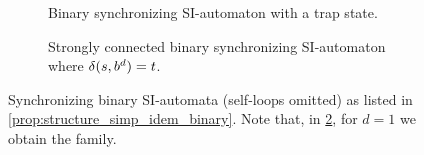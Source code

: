 \begin{figure}[htb]
\begin{subfigure}[t]{.48\textwidth}
{%
		}
		\caption{Binary synchronizing SI-automaton with a trap state.}
		\label{prelim:fig:binarySI-sync-trap}
	\end{subfigure}\hfill
	\begin{subfigure}[t]{.48\textwidth}
		\centering
		\caption{Strongly connected binary synchronizing SI-automaton where
			$\delta(s,b^d)=t$.}
		\label{prelim:fig:binarySI-sync-SCC}
	\end{subfigure}
	
	\caption[Synchronizing binary SI-automata]{Synchronizing binary SI-automata (self-loops omitted)
		as listed in \cref{prop:structure_simp_idem_binary}.
		Note that, in \cref{prelim:fig:binarySI-sync-SCC}, for $d=1$ we obtain the \Cerny family.}
	\label{prelim:fig:three-state-sync-binary-SI}
	\label{fig:theorem}
\end{figure}